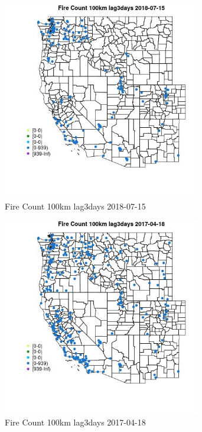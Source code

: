 \begin{figure} 
\centering  
\includegraphics[width=0.77\textwidth]{Code_Outputs/Report_ML_input_PM25_Step4_part_e_de_duplicated_aves_compiled_2019-05-21wNAs_MapObsFire_Count_100km_lag3days2018-07-15.jpg} 
\caption{\label{fig:Report_ML_input_PM25_Step4_part_e_de_duplicated_aves_compiled_2019-05-21wNAsMapObsFire_Count_100km_lag3days2018-07-15}Fire Count 100km lag3days 2018-07-15} 
\end{figure} 
 

\begin{figure} 
\centering  
\includegraphics[width=0.77\textwidth]{Code_Outputs/Report_ML_input_PM25_Step4_part_e_de_duplicated_aves_compiled_2019-05-21wNAs_MapObsFire_Count_100km_lag3days2017-04-18.jpg} 
\caption{\label{fig:Report_ML_input_PM25_Step4_part_e_de_duplicated_aves_compiled_2019-05-21wNAsMapObsFire_Count_100km_lag3days2017-04-18}Fire Count 100km lag3days 2017-04-18} 
\end{figure} 
 

